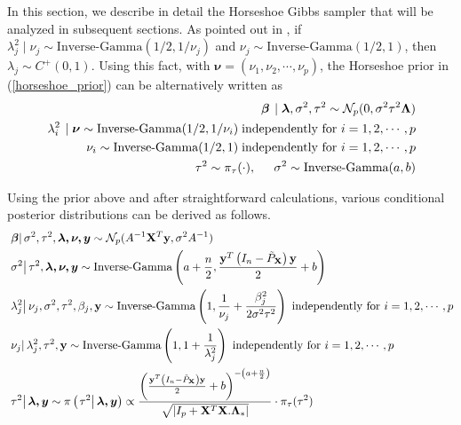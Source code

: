 \documentclass[noinfoline,11pt]{imsart}
\numberwithin{equation}{section}
\theoremstyle{plain}
\newcommand{\y}{\mathbf{y}}
\newcommand{\X}{\mathbf{X}}
\newcommand{\bb}{\boldsymbol{\beta}}
\newcommand{\bl}{\boldsymbol{\lambda}}
\newcommand{\Bl}{\boldsymbol{\Lambda}}
\newcommand\Myciteauthor[1]{\citeauthor{#1} \cite{#1}}
\begin{document}
\noindent
In this section, we describe in detail the Horseshoe Gibbs sampler that will be analyzed in subsequent sections. As pointed out in \Myciteauthor{Makalic_2016}, if $\lambda_j^2 \mid \nu_j \sim \mbox{Inverse-Gamma}(1/2, 1/\nu_j)$ and 
$\nu_j \sim \mbox{Inverse-Gamma}(1/2, 1)$, then $\lambda_j \sim C^+ (0,1)$. Using this 
fact, with ${\boldsymbol \nu} = (\nu_1, \nu_2, \cdots, \nu_p)$, the Horseshoe 
prior in 
(\ref{horseshoe_prior}) can be alternatively written as 
\begin{eqnarray}
\left. \bb \right. \mid \bl, \sigma^2,\tau^2\sim \mathcal{N}_p(0,\sigma^2\tau^2 \Bl) \nonumber\\
\left. \lambda_i^2 \right. \mid {\boldsymbol \nu} \sim \mbox{Inverse-Gamma} (1/2,1/\nu_i) \; \text{independently for}\ i=1,2,\cdots,p \nonumber\\
\nu_i \sim \mbox{Inverse-Gamma}(1/2, 1) \; \text{independently for}\ i = 1,2,\cdots, p \nonumber\\
\tau^2\sim \pi_\tau (\cdot), \hspace{0.2in} \sigma^2\sim 
\text{Inverse-Gamma}(a,b) \label{horseshoe_prior_augmented}
\end{eqnarray}

\noindent
Using the prior above and after straightforward calculations, various conditional 
posterior distributions can be derived as follows. 
\begin{eqnarray}\label{posteriors}
& \left.\boldsymbol{\beta}\right|\sigma^2,\tau^2,\boldsymbol{\lambda,\nu,y}\sim\mathcal{N}_p(A^{-1}\X^T\y,\sigma^2A^{-1})\nonumber \\
& \left.\sigma^2\right|\tau^2,\boldsymbol{\lambda,\nu,y}\sim\text{Inverse-Gamma}\left(a+\frac{n}{2},\frac{\y^T\left(I_n-\Tilde{P}_\X\right)\y}{2}+b\right)\nonumber \\
& \left.\lambda_j^2\right|\nu_j,\sigma^2,\tau^2,\beta_j, {\bf y} \sim\text{Inverse-Gamma}\left(1,\frac{1}{\nu_j}+\frac{\beta_j^2}{2\sigma^2\tau^2}\right)\ \text{independently for}\ i=1,2,\cdots,p\nonumber \\
& \left.\nu_j\right|\lambda_j^2, \tau^2, {\bf y} \sim\text{Inverse-Gamma}\left(1,1+\frac{1}{\lambda_j^2}\right)\ \text{independently for}\ i=1,2,\cdots,p\nonumber \\
& \left.\tau^2\right|\boldsymbol{\lambda,y}\sim\pi\left(\left.\tau^2\right|\boldsymbol{\lambda,y}\right)\propto\frac{\left(\frac{\y^T\left(I_n-\Tilde{P}_\X\right)\y}{2}+b\right)^{-\left(a+\frac{n}{2}\right)}}{\sqrt{\left|I_p+\X^T\X.\Bl_*\right|}}\cdot\pi_\tau(\tau^2)
\end{eqnarray}
\end{document}
